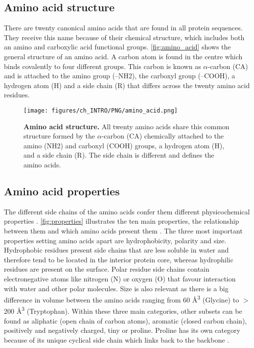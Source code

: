 \subsection{Amino acid structure}

There are twenty canonical amino acids that are found in all protein sequences. They receive this name because of their chemical structure, which includes both an amino and carboxylic acid functional groups. \autoref{fig:amino_acid} shows the general structure of an amino acid. A carbon atom is found in the centre which binds covalently to four different groups. This carbon is known as $\alpha$-carbon (CA) and is attached to the amino group (--NH2), the carboxyl group (--COOH), a hydrogen atom (H) and a side chain (R) that differs across the twenty amino acid residues.

\begin{figure}[htbp!]
    \centering
    \texttt{[image: figures/ch\_INTRO/PNG/amino\_acid.png]}
    \caption[Amino acid structure]{\textbf{Amino acid structure.} All twenty amino acids share this common structure formed by the $\alpha$-carbon (CA) chemically attached to the amino (NH2) and carboxyl (COOH) groups, a hydrogen atom (H), and a side chain (R). The side chain is different and defines the amino acids.}
    \label{fig:amino_acid}
\end{figure}

\subsection{Amino acid properties}

The different side chains of the amino acids confer them different physicochemical properties \cite{SNEATH_1966_PROPERTIES}. \autoref{fig:properties} illustrates the ten main properties, the relationship between them and which amino acids present them \cite{TAYLOR_1986_PROPERTIES}. The three most important properties setting amino acids apart are hydrophobicity, polarity and size. Hydrophobic residues present side chains that are less soluble in water and therefore tend to be located in the interior protein core, whereas hydrophilic residues are present on the surface. Polar residue side chains contain electronegative atoms like nitrogen (N) or oxygen (O) that favour interaction with water and other polar molecules. Size is also relevant as there is a big difference in volume between the amino acids ranging from 60 \AA{}\textsuperscript{3} (Glycine) to $>$200 \AA{}\textsuperscript{3} (Tryptophan). Within these three main categories, other subsets can be found as aliphatic (open chain of carbon atoms), aromatic (closed carbon chain), positively and negatively charged, tiny or proline. Proline has its own category because of its unique cyclical side chain which links back to the backbone \cite{ZVELEBIL_1987_PREDICTION}.

